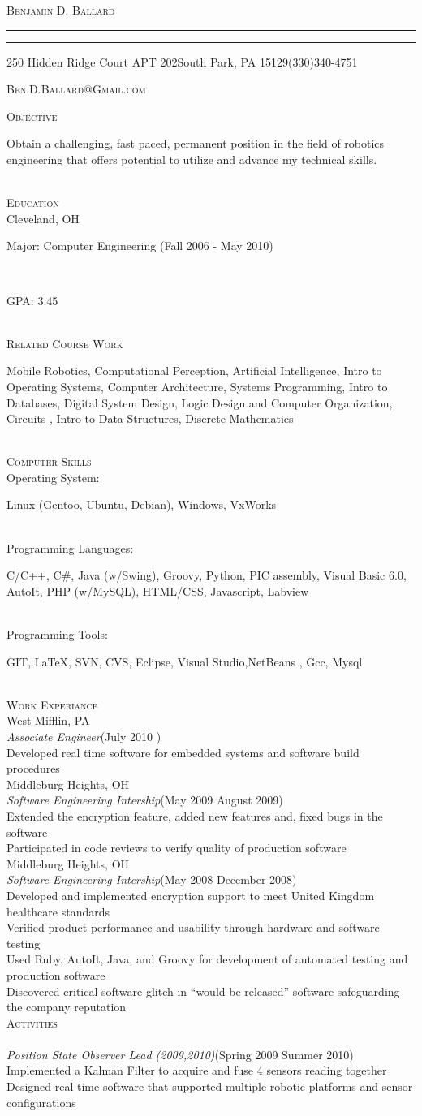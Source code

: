 \documentclass[10pt,a4paper,oneside]{article}
\makeatletter
\newcommand{\name}{\textsc{Benjamin D. Ballard}}
\newcommand{\address}{250 Hidden Ridge Court APT 202\hspace{2px}\textbullet\hspace{2px}South Park, PA 15129\hspace{2px}\textbullet\hspace{2px}(330)340-4751}
\newcommand{\email}{\textsc{Ben.D.Ballard@Gmail.com}}
\newcommand{\SkillItem}[2]{\hspace*{.5in}#1\hfill\begin{minipage}[t]{5in} #2 \end{minipage}\\}
\newcommand{\SectionHeader}[1]{\textsc{#1} \vspace{-2px}\\}
\newcommand{\CollegeHeader}[2]{\hspace*{.52in}{\bf#1} \hfill #2 \\}
\newcommand{\CompanyHeader}[4]{\hspace*{.52in}{\bf#1} \hfill #2 \\\hspace*{.5in}\emph{#3}\hfill (#4) \\}
\newcommand{\ResumeItem}[1]{\hspace*{.5in}\textopenbullet\hspace*{.2in}#1\\}
\newcommand{\TextBlock}[1]
{\hspace*{.5in} \begin{minipage}[t]{6.75in} #1 \end{minipage}\\}
\newcommand{\ResumeHeader}{
\begin{center}
{

\linespread{0}

\Huge{\textsc{\name}}

\small
\nointerlineskip \vspace{4px}%
  \hspace{\fill}
\rule{7.25in}{1px}
 \par\nointerlineskip \vspace{\baselineskip}
\nointerlineskip \vspace{0px}%
  \hspace{\fill}
\rule{7.25in}{1px}
 \par \nointerlineskip \vspace{1px}
 \address \par \nointerlineskip \vspace{\baselineskip}
 \email
}
\end{center}
}
\makeatother
\begin{document}
\ResumeHeader
\vspace{-12px}

\SectionHeader{Objective}
\TextBlock{Obtain a challenging, fast paced, permanent position in the field of robotics engineering that offers potential to utilize and advance my technical skills.}
\SectionHeader{Education}
\CollegeHeader{Case Western Reserve University}{Cleveland, OH}
\TextBlock{Major: Computer Engineering \hfill (Fall 2006 - May  2010)}
\TextBlock{GPA: 3.45}
\SectionHeader{Related Course Work}
\TextBlock{Mobile Robotics, Computational Perception, Artificial Intelligence, Intro to Operating Systems, Computer Architecture, Systems Programming, Intro to Databases, Digital System Design, Logic Design and Computer Organization, Circuits , Intro to Data Structures, Discrete Mathematics}
\SectionHeader{Computer Skills}
\SkillItem{Operating System:}{Linux (Gentoo, Ubuntu, Debian), Windows, VxWorks}
\SkillItem{Programming Languages:}{C/C++, C\#, Java (w/Swing), Groovy, Python, PIC assembly, Visual Basic 6.0, AutoIt, PHP (w/MySQL), HTML/CSS, Javascript, Labview}
\SkillItem{Programming Tools:}{GIT, \LaTeX, SVN, CVS, Eclipse, Visual Studio,NetBeans , Gcc, Mysql}
\SectionHeader{Work Experiance}
\CompanyHeader{Bechtel Marine Propulsion Company}{West Mifflin, PA}{Associate Engineer}{July 2010 \textendash { Present}}
\ResumeItem{Developed real time software for embedded systems and software build procedures}
\CompanyHeader{Codonics}{Middleburg Heights, OH}{Software Engineering Intership}{May 2009 \textendash
 { }August 2009}
 \ResumeItem{Extended the encryption feature, added new features and, fixed bugs in the software}
 \ResumeItem{Participated in code reviews to verify quality of production software}
 \CompanyHeader{Codonics}{Middleburg Heights, OH}{Software Engineering Intership}{May 2008 \textendash
 { }December 2008}
 \ResumeItem{Developed and implemented encryption support to meet United Kingdom healthcare standards}
 \ResumeItem{Verified product performance and usability through hardware and software testing}
 \ResumeItem{Used Ruby, AutoIt, Java, and Groovy for development of automated testing and production software} 
 \ResumeItem{Discovered critical software glitch in ``would be released'' software safeguarding the company reputation}
\SectionHeader{Activities}
\CompanyHeader{Intelligent Ground Vehicle Competition}{}{Position State Observer Lead (2009,2010)}{Spring 2009 \textendash { }Summer 2010}
 \ResumeItem{Implemented a Kalman Filter to acquire and fuse 4 sensors reading together}
 \ResumeItem{Designed real time software that supported multiple robotic platforms and sensor configurations}
\end{document}
